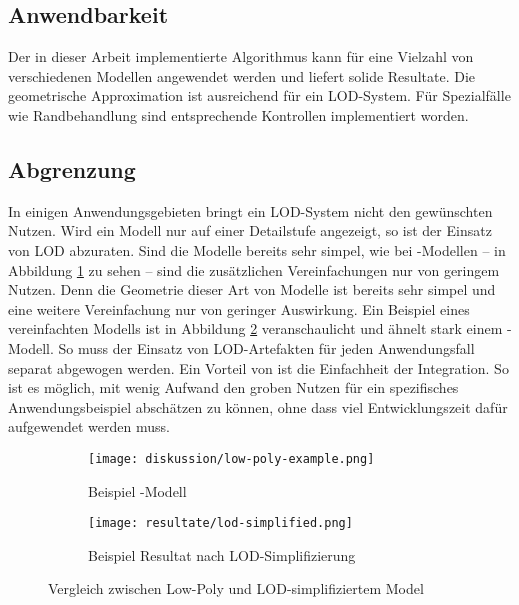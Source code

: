 \subsection{Anwendbarkeit}

Der in dieser Arbeit implementierte Algorithmus kann für eine Vielzahl von verschiedenen Modellen angewendet werden und liefert solide Resultate. Die geometrische Approximation ist ausreichend für ein LOD-System. Für Spezialfälle wie Randbehandlung sind entsprechende Kontrollen implementiert worden.


\subsection{Abgrenzung}


In einigen Anwendungsgebieten bringt ein LOD-System nicht den gewünschten Nutzen. Wird ein Modell nur auf einer Detailstufe angezeigt, so ist der Einsatz von LOD abzuraten. Sind die Modelle bereits sehr simpel, wie bei -Modellen – in Abbildung \ref{fig:lowPolyExample} zu sehen – sind die zusätzlichen Vereinfachungen nur von geringem Nutzen. Denn die Geometrie dieser Art von Modelle ist bereits sehr simpel und eine weitere Vereinfachung nur von geringer Auswirkung. Ein Beispiel eines vereinfachten Modells ist in Abbildung \ref{fig:lodModelSimplified} veranschaulicht und ähnelt stark einem -Modell.
So muss der Einsatz von LOD-Artefakten für jeden Anwendungsfall separat abgewogen werden. Ein Vorteil von  ist die Einfachheit der Integration. So ist es möglich, mit wenig Aufwand den groben Nutzen für ein spezifisches Anwendungsbeispiel abschätzen zu können, ohne dass viel Entwicklungszeit dafür aufgewendet werden muss.

\begin{figure}[H]
  \centering
  \begin{subfigure}{.5\textwidth}
    \centering
    \texttt{[image: diskussion/low-poly-example.png]}
    \caption{Beispiel -Modell}
    \label{fig:lowPolyExample}
  \end{subfigure}%
  \begin{subfigure}{.5\textwidth}
    \centering
    \texttt{[image: resultate/lod-simplified.png]}
    \caption{Beispiel Resultat nach LOD-Simplifizierung}
    \label{fig:lodModelSimplified}
  \end{subfigure}
  \caption{Vergleich zwischen Low-Poly und LOD-simplifiziertem Model}
  \label{fig:comparisonLowPolyAndLOD}
\end{figure}

